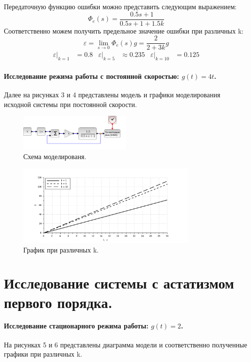 \documentclass[a3paper, 11pt]{article}
\begin{document}
Передаточную функцию ошибки можно представить следующим выражением: 
\begin{equation}
    \Phi_e(s) = \frac{0.5s + 1}{0.5s + 1 + 1.5k}     
\end{equation}
Соответственно можем получить предельное значение ошибки при различных k:
\begin{equation}
    \varepsilon = \lim_{s\rightarrow 0}{\Phi_e(s)}g = \frac{2}{2 + 3k}g
\end{equation}
\begin{align*}
    \varepsilon|_{k = 1} & = 0.8 & \varepsilon|_{k = 5} & \approx 0.235 & \varepsilon|_{k = 10} & = 0.125
\end{align*}


\newpage
\paragraph{Исследование режима работы с постоянной скоростью: $g(t) = 4t$.}
Далее на рисунках 3 и 4 представлены модель и графики моделирования исходной системы при постоянной скорости.
\begin{figure}[h!]
    \centering
    \includegraphics[width = 0.5\textwidth]{images/model1-2.pdf}
    \caption{Схема моделированя.}
\end{figure}
\begin{figure}[h!]
    \centering
    \includegraphics[width = 0.8\textwidth]{images/graph1-2.pdf}
    \caption{График при различных k.}
\end{figure}

\section*{Исследование системы с астатизмом первого порядка.}
\paragraph{Исследование стационарного режима работы: $g(t) = 2$.} На рисунках 5 и 6 представлены диаграмма модели и соответственно полученные графики при различных k.
\end{document}
